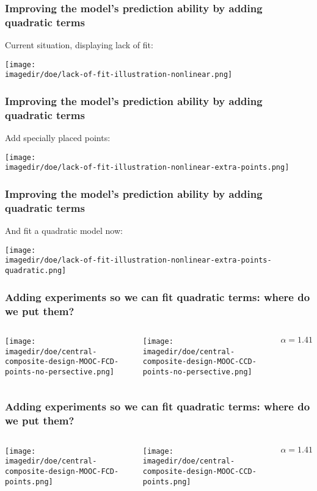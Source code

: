 \documentclass[handout,11pt,aspectratio=169,mathserif]{beamer}
\begin{document}
\begin{frame}\frametitle{Improving the model's prediction ability by adding quadratic terms}
	Current situation, displaying lack of fit:
	
	\centerline{\texttt{[image: \\imagedir/doe/lack-of-fit-illustration-nonlinear.png]}}
\end{frame}

\begin{frame}\frametitle{Improving the model's prediction ability by adding quadratic terms}
	Add specially placed points:
	
	\centerline{\texttt{[image: \\imagedir/doe/lack-of-fit-illustration-nonlinear-extra-points.png]}}
\end{frame}

\begin{frame}\frametitle{Improving the model's prediction ability by adding quadratic terms}
	And fit a quadratic model now:
	
	\centerline{\texttt{[image: \\imagedir/doe/lack-of-fit-illustration-nonlinear-extra-points-quadratic.png]}}
\end{frame}

\begin{frame}\frametitle{Adding experiments so we can fit quadratic terms: where do we put them?}
	\begin{columns}[T]
			\centerline{\texttt{[image: \\imagedir/doe/central-composite-design-MOOC-FCD-points-no-persective.png]}}
			\centerline{\texttt{[image: \\imagedir/doe/central-composite-design-MOOC-CCD-points-no-persective.png]}}
			\vspace{-0.5cm}
			\[\alpha = 1.41\]
	\end{columns}
\end{frame}

\begin{frame}\frametitle{Adding experiments so we can fit quadratic terms: where do we put them?}
	\begin{columns}[T]
			\centerline{\texttt{[image: \\imagedir/doe/central-composite-design-MOOC-FCD-points.png]}}
			\centerline{\texttt{[image: \\imagedir/doe/central-composite-design-MOOC-CCD-points.png]}}
			
			\vspace{-0.5cm}
			\[\alpha = 1.41\]
	\end{columns}
\end{frame}
\end{document}
